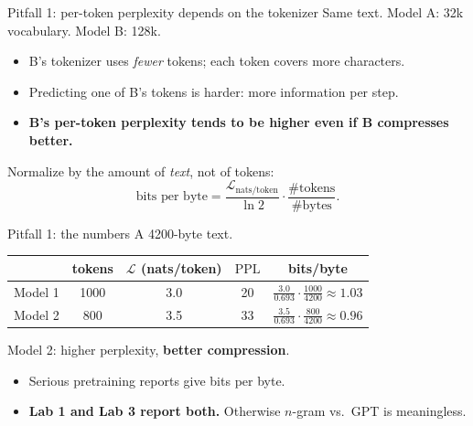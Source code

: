 \documentclass[11pt,aspectratio=169]{beamer}
\newcommand{\Lc}{\mathcal{L}}
\newcommand{\PPL}{\mathrm{PPL}}
\newcommand{\dest}[1]{\textcolor{structure}{\textbf{#1}}}
\begin{document}
\begin{frame}{Pitfall 1: per-token perplexity depends on the tokenizer}
  Same text. Model A: 32k vocabulary. Model B: 128k.

  \vspace{0.6em}
  \begin{itemize}
    \item B's tokenizer uses \emph{fewer} tokens; each token covers more characters.
    \item Predicting one of B's tokens is harder: more information per step.
    \item \dest{B's per-token perplexity tends to be higher even if B compresses better.}
  \end{itemize}

  \vspace{0.8em}
  Normalize by the amount of \emph{text}, not of tokens:
  \[
    \text{bits per byte}
    = \frac{\Lc_{\text{nats/token}}}{\ln 2}\cdot\frac{\#\text{tokens}}{\#\text{bytes}} .
  \]
\end{frame}

\begin{frame}{Pitfall 1: the numbers}
  A 4200-byte text.

  \vspace{0.6em}
  \begin{center}
  \begin{tabular}{@{}lcccc@{}}
    \toprule
    & tokens & $\Lc$ (nats/token) & $\PPL$ & bits/byte \\
    \midrule
    Model 1 & 1000 & 3.0 & 20 & $\frac{3.0}{0.693}\cdot\frac{1000}{4200} \approx 1.03$ \\[0.6em]
    Model 2 & 800 & 3.5 & 33 & $\frac{3.5}{0.693}\cdot\frac{800}{4200} \approx 0.96$ \\
    \bottomrule
  \end{tabular}
  \end{center}

  \vspace{0.8em}
  Model 2: higher perplexity, \dest{better compression}.

  \vspace{0.6em}
  \begin{itemize}
    \item Serious pretraining reports give bits per byte.
    \item \textbf{Lab 1 and Lab 3 report both.} Otherwise $n$-gram vs.\ GPT is meaningless.
  \end{itemize}
\end{frame}
\end{document}
